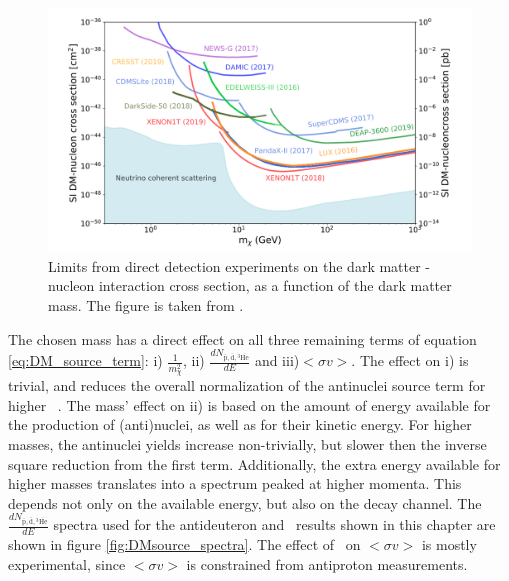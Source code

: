 \begin{figure}
    \centering
    \includegraphics[width=\textwidth]{figures/Direct_detection_limits.png}
    \caption{Limits from direct detection experiments on the dark matter - nucleon interaction cross section, as a function of the dark matter mass. The figure is taken from \cite{Zyla_direct_detection}.}
    \label{fig:DirectDetectionLimits}
\end{figure}

The chosen mass has a direct effect on all three remaining terms of equation \ref{eq:DM_source_term}: i) $\frac{1}{m_\chi^2}$, ii) $\frac{dN_{\mathrm{\bar{p}, \bar{d}, {^3\overline{He}}}}}{dE}$  and iii)$<\sigma v>$. The effect on i) is trivial, and reduces the overall normalization of the antinuclei source term for higher \dmm\ . The mass' effect on ii) is based on the amount of energy available for the production of (anti)nuclei, as well as for their kinetic energy. For higher masses, the antinuclei yields increase non-trivially, but slower then the inverse square reduction from the first term. Additionally, the extra energy available for higher masses translates into a spectrum peaked at higher momenta. This depends not only on the available energy, but also on the decay channel. The $\frac{dN_{\mathrm{\bar{p}, \bar{d}, {^3\overline{He}}}}}{dE}$ spectra used for the antideuteron and \ahe\ results shown in this chapter are shown in figure \ref{fig:DMsource_spectra}. The effect of \dmm\ on $<\sigma v>$ is mostly experimental, since $<\sigma v>$ is constrained from antiproton measurements. 

